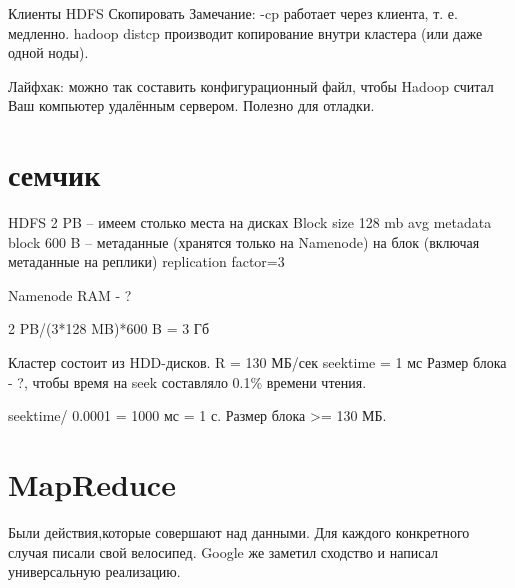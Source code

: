 Клиенты HDFS
Скопировать
Замечание: -cp работает через клиента, т. е. медленно. hadoop distcp производит копирование внутри кластера (или даже одной ноды). 

Лайфхак: можно так составить конфигурационный файл, чтобы Hadoop считал Ваш компьютер удалённым сервером. Полезно для отладки.


\section{семчик}
HDFS 2 PB -- имеем столько места на дисках
Block size 128 mb
avg metadata block 600 B -- метаданные (хранятся только на Namenode) на блок (включая метаданные на реплики)
replication factor=3

Namenode RAM - ?

2 PB/(3*128 MB)*600 B = 3 Гб



Кластер состоит из HDD-дисков. 
R = 130 МБ/сек
seektime = 1 мс
Размер блока - ?, чтобы время на seek составляло 0.1\% времени чтения.

seektime/ 0.0001 = 1000 мс = 1 с.
Размер блока >= 130 МБ.

\section{MapReduce}
Были действия,которые совершают над данными. Для каждого конкретного случая писали свой велосипед. Google же заметил сходство и написал универсальную реализацию.

